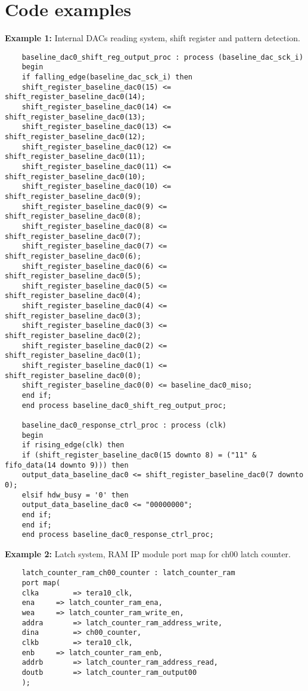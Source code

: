 \chapter{Code examples}\label{codeexamples}
\noindent \textbf{Example 1:} Internal DACs reading system, shift register and pattern detection. 
\begin{verbatim}
	baseline_dac0_shift_reg_output_proc : process (baseline_dac_sck_i)
	begin
	if falling_edge(baseline_dac_sck_i) then 
	shift_register_baseline_dac0(15) <= shift_register_baseline_dac0(14);
	shift_register_baseline_dac0(14) <= shift_register_baseline_dac0(13);
	shift_register_baseline_dac0(13) <= shift_register_baseline_dac0(12);
	shift_register_baseline_dac0(12) <= shift_register_baseline_dac0(11);
	shift_register_baseline_dac0(11) <= shift_register_baseline_dac0(10);
	shift_register_baseline_dac0(10) <= shift_register_baseline_dac0(9);
	shift_register_baseline_dac0(9) <= shift_register_baseline_dac0(8);
	shift_register_baseline_dac0(8) <= shift_register_baseline_dac0(7);
	shift_register_baseline_dac0(7) <= shift_register_baseline_dac0(6);
	shift_register_baseline_dac0(6) <= shift_register_baseline_dac0(5);
	shift_register_baseline_dac0(5) <= shift_register_baseline_dac0(4);
	shift_register_baseline_dac0(4) <= shift_register_baseline_dac0(3);
	shift_register_baseline_dac0(3) <= shift_register_baseline_dac0(2);
	shift_register_baseline_dac0(2) <= shift_register_baseline_dac0(1);
	shift_register_baseline_dac0(1) <= shift_register_baseline_dac0(0);
	shift_register_baseline_dac0(0) <= baseline_dac0_miso;
	end if;
	end process baseline_dac0_shift_reg_output_proc;
	
	baseline_dac0_response_ctrl_proc : process (clk)
	begin
	if rising_edge(clk) then 
	if (shift_register_baseline_dac0(15 downto 8) = ("11" & fifo_data(14 downto 9))) then
	output_data_baseline_dac0 <= shift_register_baseline_dac0(7 downto 0);
	elsif hdw_busy = '0' then	
	output_data_baseline_dac0 <= "00000000";
	end if;
	end if;
	end process baseline_dac0_response_ctrl_proc;
\end{verbatim}
\newpage
\noindent \textbf{Example 2:} Latch system, RAM IP module port map for ch00 latch counter.
\begin{verbatim}
	latch_counter_ram_ch00_counter : latch_counter_ram
	port map(
	clka		=> tera10_clk,
	ena		=> latch_counter_ram_ena,
	wea		=> latch_counter_ram_write_en,
	addra		=> latch_counter_ram_address_write,
	dina		=> ch00_counter,
	clkb		=> tera10_clk,
	enb		=> latch_counter_ram_enb,
	addrb		=> latch_counter_ram_address_read,
	doutb		=> latch_counter_ram_output00
	);
\end{verbatim}
